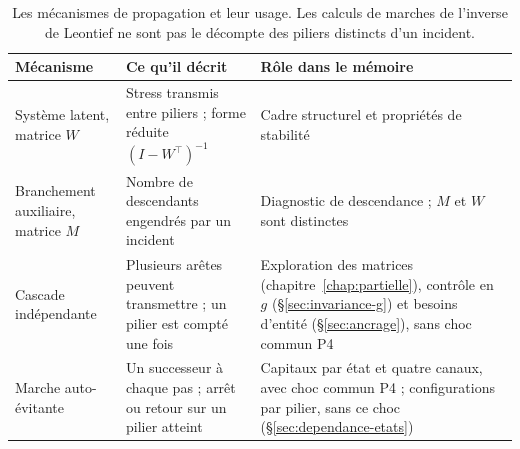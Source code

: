 \begin{table}[htbp]\centering\small
\renewcommand{\arraystretch}{1.22}
\begin{tabularx}{\textwidth}{@{}p{}>{\raggedright\arraybackslash}X>{\raggedright\arraybackslash}X@{}}
\toprule
\textbf{Mécanisme} & \textbf{Ce qu'il décrit} & \textbf{Rôle dans le mémoire} \\
\midrule
Système latent, matrice $W$ & Stress transmis entre piliers ; forme réduite $(I-W^\top)^{-1}$ & Cadre structurel et propriétés de stabilité \\
Branchement auxiliaire, matrice $M$ & Nombre de descendants engendrés par un incident & Diagnostic de descendance ; $M$ et $W$ sont distinctes \\
Cascade indépendante & Plusieurs arêtes peuvent transmettre ; un pilier est compté une fois & Exploration des matrices (chapitre~\ref{chap:partielle}), contrôle en $g$ (\S\ref{sec:invariance-g}) et besoins d'entité (\S\ref{sec:ancrage}), sans choc commun P4 \\
Marche auto-évitante & Un successeur à chaque pas ; arrêt ou retour sur un pilier atteint & Capitaux par état et quatre canaux, avec choc commun P4 ; configurations par pilier, sans ce choc (\S\ref{sec:dependance-etats}) \\
\bottomrule
\end{tabularx}
\caption{Les mécanismes de propagation et leur usage. Les calculs de marches de l'inverse de Leontief ne sont pas le décompte des piliers distincts d'un incident.}
\label{tab:lecture-mecanismes}
\end{table}
